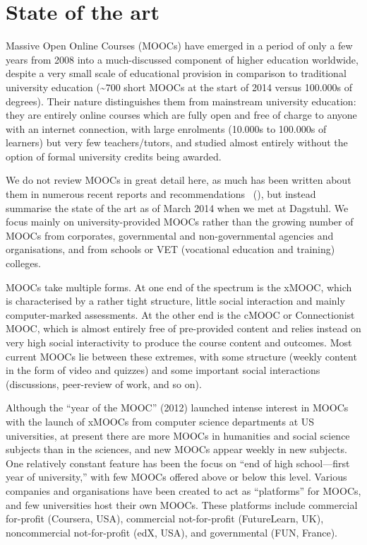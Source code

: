 \section{State of the art}

Massive Open Online Courses (MOOCs) have emerged in a period of only a
few years from 2008 into a much-discussed component of higher education
worldwide, despite a very small scale of educational provision in
comparison to traditional university education (\textasciitilde{}700
short MOOCs at the 
start of 2014 versus 100.000s of degrees).  Their nature distinguishes
them from mainstream university education: they are entirely online
courses which are fully open and free of charge to anyone with an
internet connection, with large enrolments (10.000s to 100.000s of
learners) but very few teachers/tutors, and studied almost entirely
without the option of formal university credits being awarded.

We do not review MOOCs in great detail here, as much has been written
about them in numerous recent reports and recommendations~\cite{gaebel-moocs-2014,uk.gov.mooc-2013,UUK-mooc-2013,past-2013,InvasionoftheMOOCs-2014} (), but instead summarise the state of
the art as of March 2014 when we met at Dagstuhl.
We focus mainly on university-provided MOOCs rather than
the growing number of MOOCs from corporates, governmental and
non-governmental agencies and organisations, and from schools or VET
(vocational education and training)
colleges.

MOOCs take multiple forms.  At one end of the spectrum is the xMOOC,
which is characterised by a rather tight structure, little social
interaction and mainly computer-marked assessments.  
At the other end
is the cMOOC or Connectionist MOOC, which is almost entirely free of
pre-provided content and relies instead on very high social
interactivity to produce the 
course content and outcomes.  Most current MOOCs lie
between these extremes, with some structure (weekly content in the form
of video and quizzes) and some important social interactions
(discussions, peer-review of work, and so on).

Although the ``year of the MOOC'' (2012) launched intense interest in
MOOCs with the launch of xMOOCs from computer science
departments at US universities, at present there are more MOOCs in
humanities and social 
science subjects than in the sciences, and new MOOCs appear weekly in new
subjects.  One relatively constant feature has been the focus on ``end of
high school---first year of university,'' with few MOOCs offered above or
below this level.  Various companies and organisations have been created
to act as   ``platforms'' for MOOCs, and few universities host their own
MOOCs. These platforms include commercial for-profit (Coursera, USA),
commercial not-for-profit (FutureLearn, UK), noncommercial
not-for-profit (edX, USA), and governmental (FUN, France).

